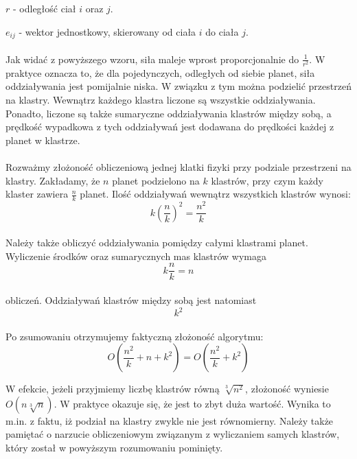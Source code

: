 $ r $ - odległość ciał $i$ oraz $j$. 

$ e_{ij} $ - wektor jednostkowy, skierowany od ciała $i$ do ciała $j$. 

\paragraph{}

Jak widać z powyższego wzoru, siła maleje wprost proporcjonalnie do $ \frac {1}{r^2} $. W praktyce oznacza to, że dla pojedynczych, odległych od siebie planet, siła oddziaływania jest pomijalnie niska. W związku z tym można podzielić przestrzeń na klastry. Wewnątrz każdego klastra liczone są wszystkie oddziaływania. Ponadto, liczone są także sumaryczne oddziaływania klastrów między sobą, a prędkość wypadkowa z tych oddziaływań jest dodawana do prędkości każdej z planet w klastrze.

\paragraph{}
Rozważmy złożoność obliczeniową jednej klatki fizyki przy podziale przestrzeni na klastry. Zakładamy, że $n$ planet podzielono na $k$ klastrów, przy czym każdy klaster zawiera $\frac{n}{k}$ planet. Ilość oddziaływań wewnątrz wszystkich klastrów wynosi:
$$ k\left(\frac{n}{k}\right)^2 = \frac{n^2}{k}$$

\paragraph{}
Należy także obliczyć oddziaływania pomiędzy całymi klastrami planet. Wyliczenie środków oraz sumarycznych mas klastrów wymaga
$$ k\frac{n}{k} = n $$

\paragraph{}
obliczeń. Oddziaływań klastrów między sobą jest natomiast
$$ k^2 $$

\paragraph{}
Po zsumowaniu otrzymujemy faktyczną złożoność algorytmu:
$$ O( \frac{n^2}{k} + n + k^2 ) = O( \frac{n^2}{k} + k^2 ) $$

W efekcie, jeżeli przyjmiemy liczbę klastrów równą $\sqrt[3]{n^2}$, złożoność wyniesie $O(n\sqrt[3]{n})$. W praktyce okazuje się, że jest to zbyt duża wartość. Wynika to m.in. z faktu, iż podział na klastry zwykle nie jest równomierny. Należy także pamiętać o narzucie obliczeniowym związanym z wyliczaniem samych klastrów, który został w powyższym rozumowaniu pominięty.

